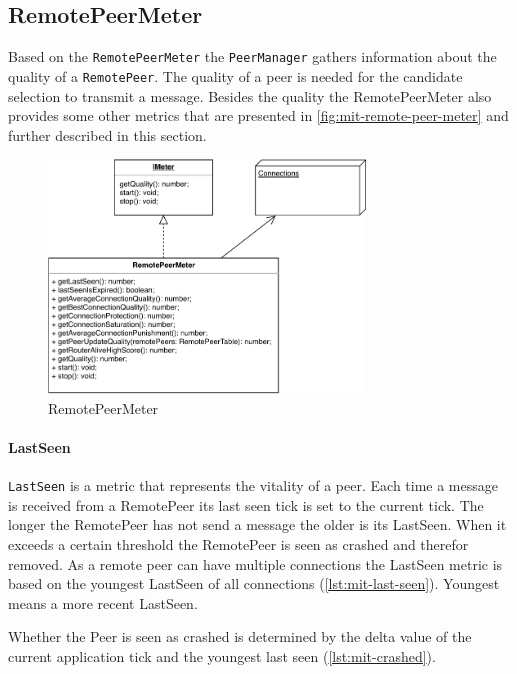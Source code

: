 \subsection{RemotePeerMeter}\label{sec:mit-peer-meter}
Based on the \lstinline|RemotePeerMeter| the \lstinline|PeerManager| gathers information about the quality of a \lstinline|RemotePeer|. The quality of a peer is needed for the candidate selection to transmit a message.
Besides the quality the RemotePeerMeter also provides some other metrics that are presented in \vref{fig:mit-remote-peer-meter} and further described in this section.

\begin{figure}
\centering
\includegraphics[width=0.75\textwidth]{graphics/implementation/mitosis-architecture-PeerMeter.pdf}
\caption{RemotePeerMeter}
\label{fig:mit-remote-peer-meter}
\end{figure}

\paragraph{LastSeen}
\lstinline|LastSeen| is a metric that represents the vitality of a peer. Each time a message is received from a RemotePeer its last seen tick is set to the current tick. The longer the RemotePeer has not send a message the older is its LastSeen. When it exceeds a certain threshold the RemotePeer is seen as crashed and therefor removed. 
As a remote peer can have multiple connections the LastSeen metric is based on the youngest LastSeen of all connections (\vref{lst:mit-last-seen}). Youngest means a more recent LastSeen.

Whether the Peer is seen as crashed is determined by the delta value of the current application tick and the youngest last seen (\vref{lst:mit-crashed}).

